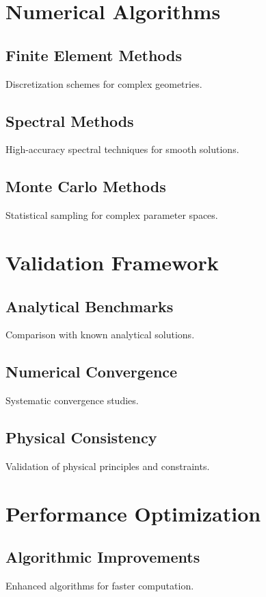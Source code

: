 \documentclass{article}
\begin{document}
\section{Numerical Algorithms}

\subsection{Finite Element Methods}
Discretization schemes for complex geometries.

\subsection{Spectral Methods}
High-accuracy spectral techniques for smooth solutions.

\subsection{Monte Carlo Methods}
Statistical sampling for complex parameter spaces.

\section{Validation Framework}

\subsection{Analytical Benchmarks}
Comparison with known analytical solutions.

\subsection{Numerical Convergence}
Systematic convergence studies.

\subsection{Physical Consistency}
Validation of physical principles and constraints.

\section{Performance Optimization}

\subsection{Algorithmic Improvements}
Enhanced algorithms for faster computation.
\end{document}
